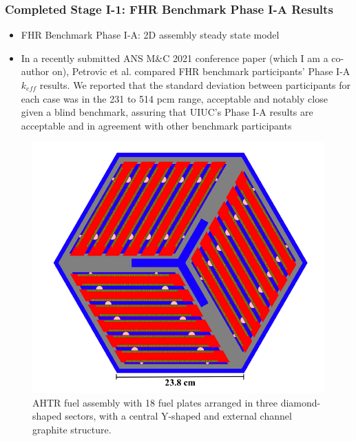 \begin{frame}
    \frametitle{Completed Stage I-1: FHR Benchmark Phase I-A Results}
    \begin{itemize}
        \item FHR Benchmark Phase I-A: 2D assembly steady state model
        \item In a recently submitted ANS M$\&$C 2021 conference paper 
        (which I am a co-author on), 
        Petrovic et al. \cite{petrovic_preliminary_2021} compared FHR benchmark 
        participants' Phase I-A $k_{eff}$ results.  
        We reported that the standard deviation between participants for each case 
        was in the 231 to 514 pcm range, acceptable and notably close given a blind 
        benchmark, assuring that \gls{UIUC}'s Phase I-A results are acceptable and 
        in agreement with other benchmark participants 
    \end{itemize}
    \begin{figure}[]
        \begin{minipage}[c]{0.5\textwidth}
        \centering
        \includegraphics[width=0.75\linewidth]{figures/ahtr-assembly.png} 
        \end{minipage}\hfill
        \begin{minipage}[c]{0.5\textwidth}
        \caption{\acrfull{AHTR} fuel assembly with 18 fuel plates arranged in 
        three diamond-shaped sectors, with a central Y-shaped and external channel 
        graphite structure.}
        \end{minipage}
    \end{figure}
\end{frame}

